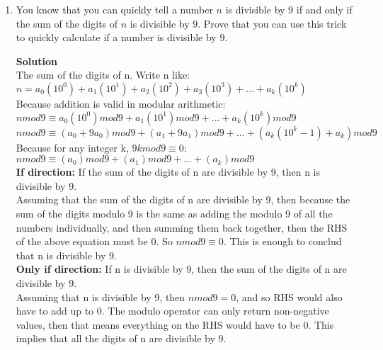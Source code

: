 \documentclass[11pt]{article}
\newenvironment{Parts}{\begin{enumerate}[label=(\alph*)]}{\end{enumerate}}
\newcommand*{\Part}{\item}
\begin{document}
\begin{Parts}
\pagebreak 

\Part You know that you can quickly tell a number $n$ is divisible by $9$ if and only if the sum of the digits of $n$ is divisible by $9$. Prove that you can use this trick to quickly calculate if a number is divisible by $9$.
\begin{mdframed} \textbf{Solution} \\
The sum of the digits of n. Write n like: \\
$n=a_0(10^0)+a_1(10^1)+a_2(10^2)+a_3(10^3)+...+a_k(10^k)$ \\
Because addition is valid in modular arithmetic: \\
$nmod9 \equiv a_0(10^0)mod9+a_1(10^1)mod9+...+a_k(10^k)mod9$ \\
$nmod9 \equiv (a_0+9a_0)mod9+(a_1+9a_1)mod9+...+(a_k(10^k-1)+a_k)mod9$ \\
Because for any integer k, $9kmod9 \equiv 0$: \\
$nmod9 \equiv (a_0)mod9+(a_1)mod9+...+(a_k)mod9$ \\
\textbf{If direction:} If the sum of the digits of n are divisible by 9, then n is divisible by 9. \\
Assuming that the sum of the digits of n are divisible by 9, then because the sum of the digits modulo 9 is the same as adding the modulo 9 of all the numbers individually, and then summing them back together, then the RHS of the above equation must be 0. So $nmod9 \equiv 0$. This is enough to conclud that n is divisible by 9. \\
\textbf{Only if direction:} If n is divisible by 9, then the sum of the digits of n are divisible by 9. \\
Assuming that n is divisible by 9, then $nmod9=0$, and so RHS would also have to add up to 0. The modulo operator can only return non-negative values, then that means everything on the RHS would have to be 0. This implies that all the digits of n are divisible by 9. \\
\end{mdframed}

\end{Parts}

\pagebreak 
\end{document}

